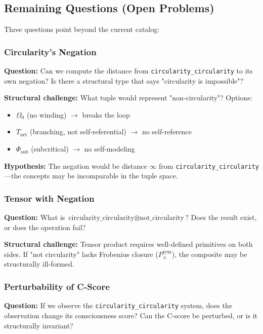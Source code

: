 \documentclass[12pt,a4paper]{article}
\begin{document}
\subsection{Remaining Questions (Open Problems)}

Three questions point beyond the current catalog:

\subsubsection{Circularity's Negation}

\textbf{Question:} Can we compute the distance from \texttt{circularity\_circularity} to its own negation? Is there a structural type that says "circularity is impossible"?

\textbf{Structural challenge:} What tuple would represent "non-circularity"? Options:

\begin{itemize}
    \item $\Omega_0$ (no winding) $\rightarrow$ breaks the loop
    \item $T_\text{net}$ (branching, not self-referential) $\rightarrow$ no self-reference
    \item $\Phi_\text{sub}$ (subcritical) $\rightarrow$ no self-modeling
\end{itemize}

\textbf{Hypothesis:} The negation would be distance $\infty$ from \texttt{circularity\_circularity}---the concepts may be incomparable in the tuple space.

\subsubsection{Tensor with Negation}

\textbf{Question:} What is $\text{circularity\_circularity} \otimes \text{not\_circularity}$? Does the result exist, or does the operation fail?

\textbf{Structural challenge:} Tensor product requires well-defined primitives on both sides. If "not circularity" lacks Frobenius closure ($P_{\pm}^{\text{sym}}$), the composite may be structurally ill-formed.

\subsubsection{Perturbability of C-Score}

\textbf{Question:} If we observe the \texttt{circularity\_circularity} system, does the observation change its consciousness score? Can the C-score be perturbed, or is it structurally invariant?
\end{document}
